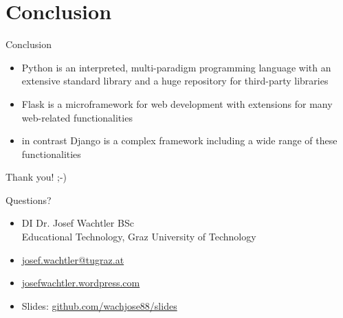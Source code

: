 \documentclass{beamer}
\begin{document}
\section{Conclusion}

\begin{frame}{Conclusion}
 
  \begin{itemize}
    \item Python is an interpreted, multi-paradigm programming language
      with an extensive standard library and a huge repository for 
      third-party libraries
    \item Flask is a microframework for web development with extensions
      for many web-related functionalities
    \item in contrast Django is a complex framework including a wide range
      of these functionalities
  \end{itemize}
  
\end{frame}

\begin{frame}{Thank you! ;-)}
  
  \begin{center}
    \begin{huge}
      Questions?
    \end{huge}
  \end{center}
 
  \begin{itemize}
    \item DI Dr. Josef Wachtler BSc \\
    Educational Technology, Graz University of Technology
    \item \href{mailto:josef.wachtler@tugraz.at}{josef.wachtler@tugraz.at} 
    \item \href{https://josefwachtler.wordpress.com/}{josefwachtler.wordpress.com} 
    \item Slides: \href{https://github.com/wachjose88/slides}{github.com/wachjose88/slides}
  \end{itemize}
  

\end{frame}
\end{document}
